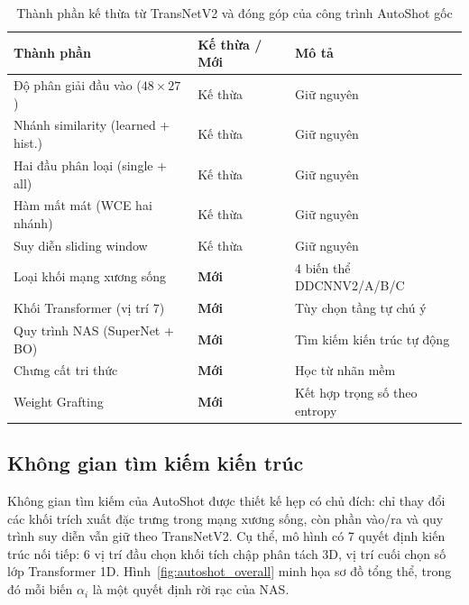 \begin{table}[H]
\centering
\caption{Thành phần kế thừa từ TransNetV2 và đóng góp của công trình AutoShot gốc}
\label{tab:autoshot_inherited}
\begin{tabularx}{\textwidth}{llY}
\toprule
\textbf{Thành phần} & \textbf{Kế thừa / Mới} & \textbf{Mô tả} \\
\midrule
Độ phân giải đầu vào ($48\times27$) & Kế thừa & Giữ nguyên \\
Nhánh similarity (learned + hist.) & Kế thừa & Giữ nguyên \\
Hai đầu phân loại (single + all) & Kế thừa & Giữ nguyên \\
Hàm mất mát (WCE hai nhánh) & Kế thừa & Giữ nguyên \\
Suy diễn sliding window & Kế thừa & Giữ nguyên \\
\midrule
Loại khối mạng xương sống & \textbf{Mới} & 4 biến thể DDCNNV2/A/B/C \\
Khối Transformer (vị trí 7) & \textbf{Mới} & Tùy chọn tầng tự chú ý \\
Quy trình NAS (SuperNet + BO) & \textbf{Mới} & Tìm kiếm kiến trúc tự động \\
Chưng cất tri thức & \textbf{Mới} & Học từ nhãn mềm \\
Weight Grafting & \textbf{Mới} & Kết hợp trọng số theo entropy \\
\bottomrule
\end{tabularx}
\end{table}

\subsection{Không gian tìm kiếm kiến trúc}
\label{subsec:autoshot_search_space}

Không gian tìm kiếm của AutoShot được thiết kế hẹp có chủ đích: chỉ thay đổi các khối trích xuất đặc trưng trong mạng xương sống, còn phần vào/ra và quy trình suy diễn vẫn giữ theo TransNetV2. Cụ thể, mô hình có 7 quyết định kiến trúc nối tiếp: 6 vị trí đầu chọn khối tích chập phân tách 3D, vị trí cuối chọn số lớp Transformer 1D. Hình~\ref{fig:autoshot_overall} minh họa sơ đồ tổng thể, trong đó mỗi biến $\alpha_i$ là một quyết định rời rạc của NAS.

